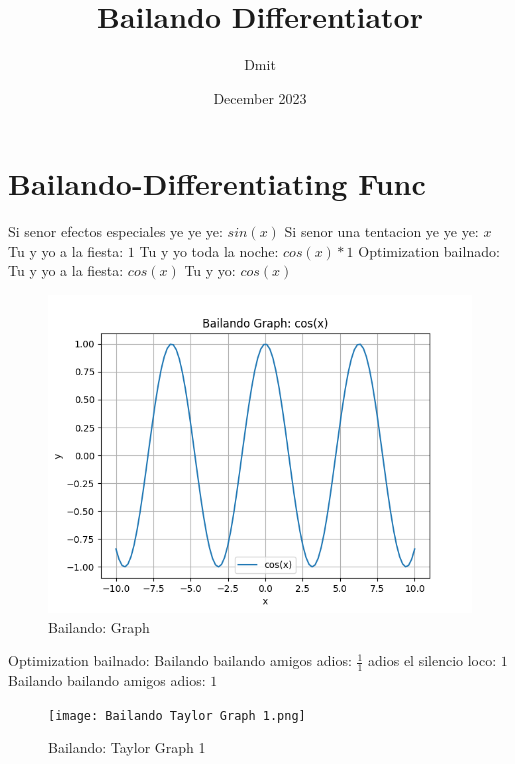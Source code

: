 \documentclass{article}
\title{Bailando Differentiator}
\author{Dmit}
\date{December 2023}
\begin{document}
 
\maketitle 
\section{Bailando-Differentiating Func} 
Si senor efectos especiales ye ye ye: $sin(x)$  \newline Si senor una tentacion ye ye ye: $x$ Tu y yo a la fiesta: $1$  \newline Tu y yo toda la noche: $cos(x)*1$  \newline \newline Optimization bailnado: \newline Tu y yo a la fiesta: $cos(x)$  \newline Tu y yo: $cos(x)$  \newline \begin{figure}
\centering
\includegraphics[width=0.8\linewidth]{Bailando Graph.png}
\caption{Bailando: Graph}
\label{fig:my_image}
\end{figure}
 \newline \newline Optimization bailnado: \newline Bailando bailando amigos adios: $\frac{1}{1}$  \newline adios el silencio loco: $1$  \newline Bailando bailando amigos adios: $1$  \newline \begin{figure}
\centering
\texttt{[image: Bailando Taylor Graph 1.png]}
\caption{Bailando: Taylor Graph 1}
\label{fig:my_image}
\end{figure}
\end{document}
